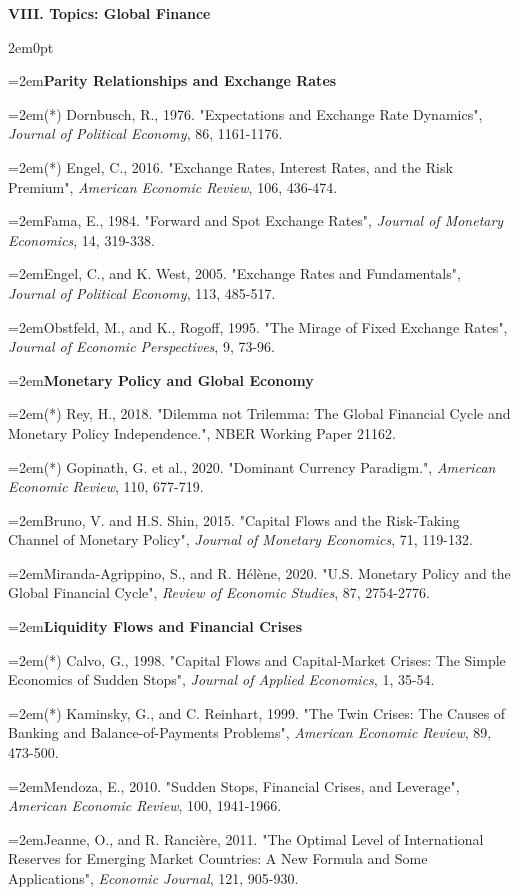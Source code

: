 \documentclass[10pt]{article}
\newcommand{\reading}{\par\hangindent=2em\hangafter=1\noindent}
\newenvironment{readingsblock}{%
  \begin{adjustwidth}{2em}{0pt} %
}{%
  \end{adjustwidth}
}
\begin{document}
  
\noindent \textbf{VIII. Topics: Global Finance} \\[6pt]

  \begin{readingsblock}
  
  \reading \textbf{Parity Relationships and Exchange Rates} \\[4pt]
  
  \reading (*) Dornbusch, R., 1976. "Expectations and Exchange Rate Dynamics", {\it Journal of Political Economy}, 86, 1161-1176.
  \reading (*) Engel, C., 2016. "Exchange Rates, Interest Rates, and the Risk Premium", {\it American Economic Review}, 106, 436-474.
  \reading Fama, E., 1984. "Forward and Spot Exchange Rates", {\it Journal of Monetary Economics}, 14, 319-338.
  \reading Engel, C., and K. West, 2005. "Exchange Rates and Fundamentals", {\it Journal of Political Economy}, 113, 485-517. 
  \reading Obstfeld, M., and K., Rogoff, 1995. "The Mirage of Fixed Exchange Rates", {\it Journal of Economic Perspectives}, 9, 73-96.\\[4pt]
  
  
  \reading \textbf{Monetary Policy and Global Economy} \\[4pt]
  
  \reading (*) Rey, H., 2018. "Dilemma not Trilemma: The Global Financial Cycle and Monetary Policy Independence.", NBER Working Paper 21162.
  \reading (*) Gopinath, G. et al., 2020. "Dominant Currency Paradigm.", {\it American Economic Review}, 110, 677-719.
  \reading Bruno, V. and H.S. Shin, 2015. "Capital Flows and the Risk-Taking Channel of Monetary Policy", {\it Journal of Monetary Economics}, 71, 119-132.
  \reading Miranda-Agrippino, S., and R. Hélène, 2020. "U.S. Monetary Policy and the Global Financial Cycle", {\it Review of Economic Studies}, 87, 2754-2776.
  \\[4pt]
  
  \reading \textbf{Liquidity Flows and Financial Crises} \\[4pt]
  
  \reading (*) Calvo, G., 1998. "Capital Flows and Capital-Market Crises: The Simple Economics of Sudden Stops", {\it Journal of Applied Economics}, 1, 35-54.
  \reading (*) Kaminsky, G., and C. Reinhart, 1999. "The Twin Crises: The Causes of Banking and Balance-of-Payments Problems", {\it American Economic Review}, 89, 473-500.
  \reading Mendoza, E., 2010. "Sudden Stops, Financial Crises, and Leverage", {\it American Economic Review}, 100, 1941-1966.
  \reading Jeanne, O., and R. Rancière, 2011. "The Optimal Level of International Reserves for Emerging Market Countries: A New Formula and Some Applications", {\it Economic Journal}, 121, 905-930.
  \\[4pt]
  

\end{readingsblock}
\end{document}
